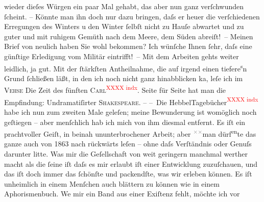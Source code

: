 \begin{ledgroupsized}[t]{13cm}
               wieder dieſes Würgen ein paar Mal gehabt, das aber nun ganz verſchwunden ſcheint. –
               Könnte man ihn doch nur dazu bringen, daſs er heuer die verſchiedenen Erregungen des
               Winters \introOben{}u den Winter ſelbſt\introOben{} nicht zu Hauſe abwartet und zu
               guter \label{T_L01424_2v}\label{T_L01424_2h} und mit ruhigem Gemüth
                  {\pb}nach dem Meere, dem Süden abreiſt! –\pend
           \pstart
           Meinen Brief von neulich haben Sie wohl bekommen? Ich wünſche Ihnen ſehr, daſs eine
               günſtige Erledigung vom Militär eintrifft! –\pend
           \pstart
           Mit dem Arbeiten gehts weiter leidlich, ja gut. Mit der ſtärkſten Antheilnahme, die
               auf irgend ein\introOben{}en\introOben{} tiefere\substVorne{}\textsuperscript{s}\substDazwischen{}n\substHinten{} Grund ſchließen läßt, in den ich noch nicht ganz hinabblicken ka{\geminationn}, leſe ich im \textsc{Vehse}{ }{\pb}Die Zeit des fünften \textsc{Carl}\textcolor{red}{\textsuperscript{XXXX indx}}. Seite für Seite hat man die Empfindung: Undramatiſirter \textsc{Shakespeare}. –\pend
           \pstart
           – Die HebbelTagebücher\textcolor{red}{\textsuperscript{XXXX indx}} habe ich nun zum zweiten Male geleſen;
               meine Bewunderung ist womöglich noch geſtiegen – aber menſchlich hab ich mich von ihm
               diesmal entfernt. Es iſt ein prachtvoller Geiſt, in beinah ununterbrochener Arbeit;
               aber \substVorne{}\textsuperscript{\textcolor{gray}{×}\-\textcolor{gray}{×}}\substDazwischen{}man\substHinten{} dürf\substVorne{}\textsuperscript{en}\substDazwischen{}te\substHinten{} das ganze auch von 1863 nach rückwärts leſen – ohne daſs
               Verſtändnis {\pb}oder Genuſs darunter litte. Was mir die
               Geſellschaft von weit geringern \introOben{}manchmal\introOben{} werther macht als
               die ſeine iſt daſs es mir erlaubt iſt einer Entwicklung zuzuſchauen, und das iſt doch
               immer das ſchönſte und packendſte, was wir erleben können. Es iſt unheimlich in einem
               Menſchen auch blättern zu können wie in einem Aphorismenbuch. We{\geminationn} mir ein Band aus einer Exiſtenz fehlt, möchte ich vor

\end{ledgroupsized}
